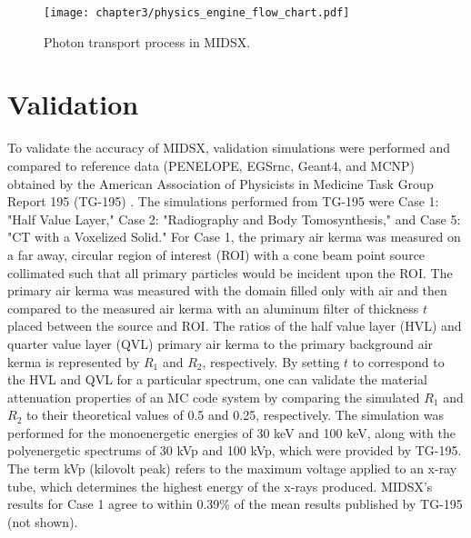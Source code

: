 \begin{figure}[H]
    \centering
	\texttt{[image: chapter3/physics\_engine\_flow\_chart.pdf]}
	\caption{Photon transport process in MIDSX.}
	\label{fig:PhysicsEngineFlowChart}
\end{figure}

\section{Validation}
\par To validate the accuracy of MIDSX, validation simulations were performed and compared to reference data (PENELOPE, EGSrnc, Geant4, and MCNP) obtained by the American Association of Physicists in Medicine Task Group Report 195 (TG-195) \cite{sechopoulos_monte_2015}. The simulations performed from TG-195 were Case 1: "Half Value Layer," Case 2: "Radiography and Body Tomosynthesis," and Case 5: "CT with a Voxelized Solid." For Case 1, the primary air kerma was measured on a far away, circular region of interest (ROI) with a cone beam point source collimated such that all primary particles would be incident upon the ROI. The primary air kerma was measured with the domain filled only with air and then compared to the measured air kerma with an aluminum filter of thickness $t$ placed between the source and ROI. The ratios of the half value layer (HVL) and quarter value layer (QVL) primary air kerma to the primary background air kerma is represented by $R_1$ and $R_2$, respectively. By setting $t$ to correspond to the HVL and QVL for a particular spectrum, one can validate the material attenuation properties of an MC code system by comparing the simulated $R_1$ and $R_2$ to their theoretical values of 0.5 and 0.25, respectively. The simulation was performed for the monoenergetic energies of 30 keV and 100 keV, along with the polyenergetic spectrums of 30 kVp and 100 kVp, which were provided by TG-195. The term kVp (kilovolt peak) refers to the maximum voltage applied to an x-ray tube, which determines the highest energy of the x-rays produced. MIDSX's results for Case 1 agree to within 0.39\% of the mean results published by TG-195 (not shown).
